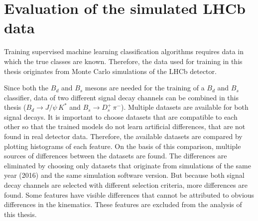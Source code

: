 \section{Evaluation of the simulated LHCb data}

Training supervised machine learning classification algorithms requires data in which the true classes are known.
Therefore, the data used for training in this thesis originates from Monte Carlo simulations of the LHCb detector. %

Since both the $B_d$ and $B_s$ mesons are needed for the training of a $B_d$ and $B_s$ classifier, data of two different signal decay channels can be combined in this thesis ($B_d \rightarrow J/\psi \, K^*$ and $B_s \rightarrow D^+_s \, \pi^-$). 
Multiple datasets are available for both signal decays.
It is important to choose datasets that are compatible to each other so that the trained models do not learn artificial differences, that are not found in real detector data.
Therefore, the available datasets are compared by plotting histograms of each feature.
On the basis of this comparison, multiple sources of differences between the datasets are found.
The differences are eliminated by choosing only datasets that originate from simulations of the same year (2016) and the same simulation software version.
But because both signal decay channels are selected with different selection criteria, more differences are found.
Some features have visible differences that cannot be attributed to obvious differences in the kinematics. %
These features are excluded from the analysis of this thesis.




